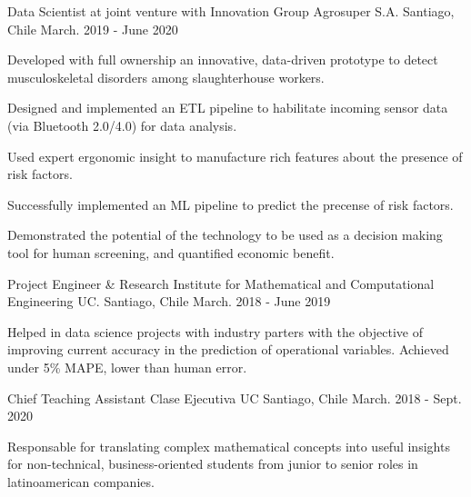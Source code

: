 

\begin{cventries}


\cventry
{Data Scientist at joint venture with Innovation Group} %
{Agrosuper S.A.} %
{Santiago, Chile} %
{March. 2019 - June 2020} %
{
  \begin{cvitems} %
    \item {Developed with full ownership an innovative, data-driven prototype to detect musculoskeletal disorders among slaughterhouse workers.}
    \item {Designed and implemented an ETL pipeline to habilitate incoming sensor data (via Bluetooth 2.0/4.0) for data analysis.}
    \item {Used expert ergonomic insight to manufacture rich features about the presence of risk factors.}
    \item {Successfully implemented an ML pipeline to predict the precense of risk factors.}
    \item {Demonstrated the potential of the technology to be used as a decision making tool for human screening, and quantified economic benefit.}
  \end{cvitems}
}
\cventry
{Project Engineer \& Research} %
{Institute for Mathematical and Computational Engineering UC.} %
{Santiago, Chile} %
{March. 2018 - June 2019} %
{
  \begin{cvitems} %
    \item {Helped in data science projects with industry parters with the objective of improving current accuracy in
    the prediction of operational variables. Achieved under 5\% MAPE, lower than human error.}
  \end{cvitems}
}


\cventry
{Chief Teaching Assistant}
{Clase Ejecutiva UC} %
{Santiago, Chile} %
{March. 2018 - Sept. 2020} %
{
  \begin{cvitems} %
    \item {Responsable for translating complex mathematical concepts into useful insights for non-technical, business-oriented students from junior to senior roles in latinoamerican companies.}
  \end{cvitems}
}


\end{cventries}
